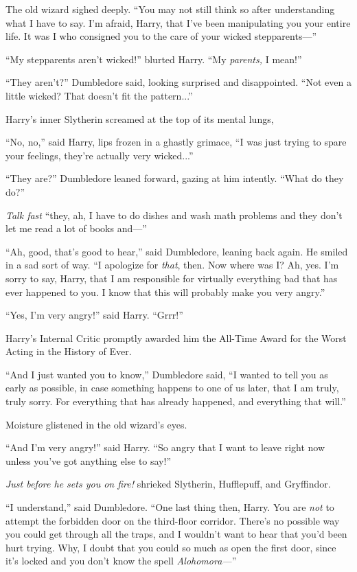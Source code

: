The old wizard sighed deeply. “You may not still think so after understanding what I have to say. I’m afraid, Harry, that I’ve been manipulating you your entire life. It was I who consigned you to the care of your wicked stepparents—”

“My stepparents aren’t wicked!” blurted Harry. “My \emph{parents,} I mean!”

“They aren’t?” Dumbledore said, looking surprised and dis\-ap\-point\-ed. “Not even a little wicked? That doesn’t fit the pattern...”

Harry’s inner Slytherin screamed at the top of its mental lungs, 

“No, no,” said Harry, lips frozen in a ghastly grimace, “I was just trying to spare your feelings, they’re actually very wicked...”

“They are?” Dumbledore leaned forward, gazing at him intently. “What do they do?”

\emph{Talk fast} “they, ah, I have to do dishes and wash math problems and they don’t let me read a lot of books and—”

“Ah, good, that’s good to hear,” said Dumbledore, leaning back again. He smiled in a sad sort of way. “I apologize for \emph{that}, then. Now where was I? Ah, yes. I’m sorry to say, Harry, that I am responsible for virtually everything bad that has ever happened to you. I know that this will probably make you very angry.”

“Yes, I’m very angry!” said Harry. “Grrr!”

Harry’s Internal Critic promptly awarded him the All-Time Award for the Worst Acting in the History of Ever.

“And I just wanted you to know,” Dumbledore said, “I wanted to tell you as early as possible, in case something happens to one of us later, that I am truly, truly sorry. For everything that has already happened, and everything that will.”

Moisture glistened in the old wizard’s eyes.

“And I’m very angry!” said Harry. “So angry that I want to leave right now unless you’ve got anything else to say!”

\emph{Just  before he sets you on fire!} shrieked Slytherin, Hufflepuff, and Gryffindor.

“I understand,” said Dumbledore. “One last thing then, Harry. You are \emph{not} to attempt the forbidden door on the third-floor corridor. There’s no possible way you could get through all the traps, and I wouldn’t want to hear that you’d been hurt trying. Why, I doubt that you could so much as open the first door, since it’s locked and you don’t know the spell \emph{Alohomora—}”

